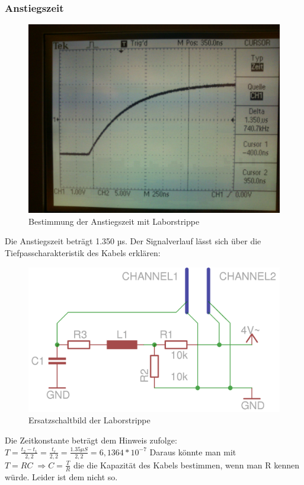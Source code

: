 \subsubsection{Anstiegszeit}
\begin{figure}[H]
	\centering
	\includegraphics[width=\linewidth]{versuch4/oszi/DSC_0324.JPG}
	\caption{Bestimmung der Anstiegszeit mit Laborstrippe}
\end{figure}
Die Anstiegszeit beträgt 1.350 µs. Der Signalverlauf lässt sich über die Tiefpasscharakteristik des Kabels erklären:
\begin{figure}[H]
	\centering
	\includegraphics[width=\linewidth]{versuch4/ersatzschaltbild_4_1_b.png}
	\caption{Ersatzschaltbild der Laborstrippe}
\end{figure}
Die Zeitkonstante beträgt dem Hinweis zufolge: $T=\frac{t_2 - t_1}{2,2}=\frac{t_r}{2,2}=\frac{1.35 \mu S}{2,2}=6,1364*10^{-7}$
Daraus könnte man mit $ T=RC \; \Rightarrow C=\frac{T}{R} $ die die Kapazität des Kabels bestimmen, wenn man R kennen würde. Leider ist dem nicht so.

